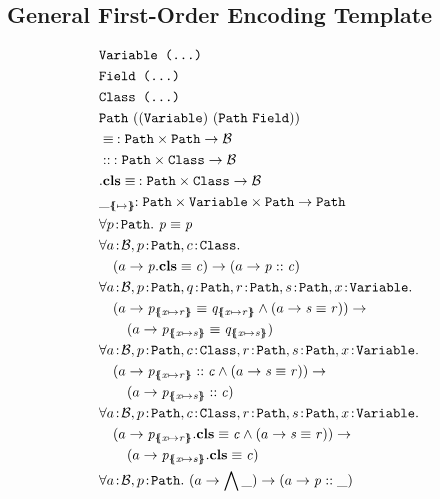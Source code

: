 \documentclass[a4paper]{article}
\begin{document}
\subsection{General First-Order Encoding Template}
\begin{align}
  &\texttt{\Variable~(...)}\\
  &\texttt{\Field~(...)}\\
  &\texttt{\Class~(...)}\\
  &\Path~((\Variable)~(\Path~\Field))\\
  &\pathEq{}{}\!\!: \Path \times \Path \rightarrow \TBool \\
  &\instOf{}{}\!\!: \Path \times \Class \rightarrow \TBool\\
  &\instBy{}{}\!\!: \Path \times \Class \rightarrow \TBool\\
  &{\_}_{\sub{}{}}\!\!: \Path \times \Variable \times \Path \rightarrow \Path\\
  &\forall \sortedVar{p}{\Path}.~\pathEq{p}{p}\\
  &\forall \sortedVar{a}{\TBool}, \sortedVar{p}{\Path}, \sortedVar{c}{\Class}.\\
  &\quad(a \rightarrow \instBy{p}{c}) \rightarrow (a \rightarrow \instOf{p}{c})\\
  &\forall \sortedVar{a}{\TBool}, \sortedVar{p}{\Path}, \sortedVar{q}{\Path}, \sortedVar{r}{\Path}, \sortedVar{s}{\Path}, \sortedVar{x}{\Variable}.\\
  &\quad (a \rightarrow \pathEq{p_{\sub{x}{r}}}{q_{\sub{x}{r}}} \land (a \rightarrow \pathEq{s}{r})) \rightarrow\\
  &\qquad (a \rightarrow \pathEq{p_{\sub{x}{s}}}{q_{\sub{x}{s}}})\\
  &\forall \sortedVar{a}{\TBool}, \sortedVar{p}{\Path}, \sortedVar{c}{\Class}, \sortedVar{r}{\Path}, \sortedVar{s}{\Path}, \sortedVar{x}{\Variable}.\\
  &\quad (a \rightarrow \instOf{p_{\sub{x}{r}}}{c} \land (a \rightarrow \pathEq{s}{r})) \rightarrow\\
  &\qquad (a \rightarrow \instOf{p_{\sub{x}{s}}}{c})\\
  &\forall \sortedVar{a}{\TBool}, \sortedVar{p}{\Path}, \sortedVar{c}{\Class}, \sortedVar{r}{\Path}, \sortedVar{s}{\Path}, \sortedVar{x}{\Variable}.\\
  &\quad (a \rightarrow \instBy{p_{\sub{x}{r}}}{c} \land (a \rightarrow \pathEq{s}{r})) \rightarrow\\
  &\qquad (a \rightarrow \instBy{p_{\sub{x}{s}}}{c})\\
  &\forall \sortedVar{a}{\TBool}, \sortedVar{p}{\Path}.~(a \rightarrow \bigwedge \hole) \rightarrow (a \rightarrow \instOf{p}{\hole})
\end{align}
\end{document}
